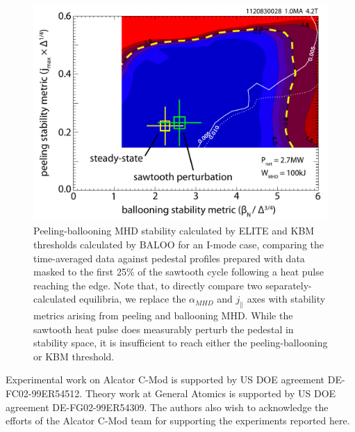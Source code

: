 \documentclass[12pt,floatfix,showpacs]{revtex4-1}
\begin{document}
\begin{figure}[htp]
 \includegraphics[width=\textwidth]{pdfgraphics/1120830028_stbin_elite.pdf}
 \caption{Peeling-ballooning MHD stability calculated by ELITE and KBM thresholds calculated by BALOO for an I-mode case, comparing the time-averaged data against pedestal profiles prepared with data masked to the first 25\% of the sawtooth cycle following a heat pulse reaching the edge.  Note that, to directly compare two separately-calculated equilibria, we replace the $\alpha_{MHD}$ and $j_\parallel$ axes with stability metrics arising from peeling and ballooning MHD.  While the sawtooth heat pulse does measurably perturb the pedestal in stability space, it is insufficient to reach either the peeling-ballooning or KBM threshold.}
 \label{fig:1120830028_stbin_elite}
\end{figure}


\begin{acknowledgments}
 Experimental work on Alcator C-Mod is supported by US DOE agreement DE-FC02-99ER54512. Theory work at General Atomics is supported by US DOE agreement DE-FG02-99ER54309.  The authors also wish to acknowledge the efforts of the Alcator C-Mod team for supporting the experiments reported here.
\end{acknowledgments}



\end{document}
